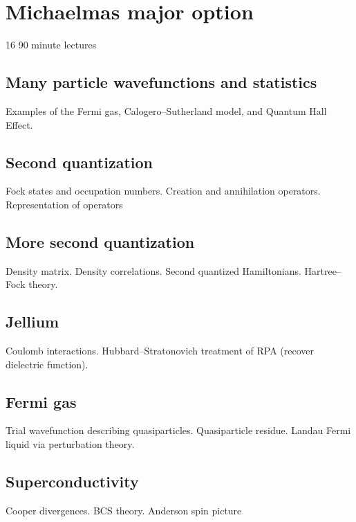 \section{Michaelmas major option}

16 90 minute lectures

\subsection{Many particle wavefunctions and statistics}

Examples of the Fermi gas, Calogero--Sutherland model, and Quantum Hall Effect.

\subsection{Second quantization}

Fock states and occupation numbers. Creation and annihilation operators. Representation of operators

\subsection{More second quantization}

Density matrix. Density correlations. Second quantized Hamiltonians. Hartree--Fock theory.

\subsection{Jellium}

Coulomb interactions. Hubbard--Stratonovich treatment of RPA (recover dielectric function).

\subsection{Fermi gas}

Trial wavefunction describing quasiparticles. Quasiparticle residue. Landau Fermi liquid via perturbation theory. 

\subsection{Superconductivity}

Cooper divergences. BCS theory. Anderson spin picture



